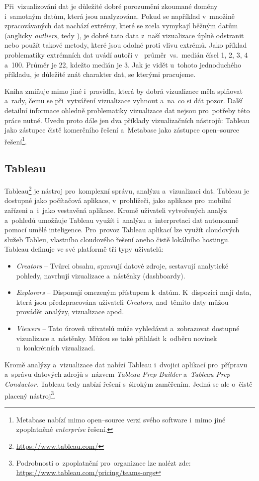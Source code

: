 Při~vizualizování dat je důležité dobré porozumění zkoumané domény i~samotným datům, která jsou analyzována. Pokud se například v~množině zpracovávaných dat nachází extrémy, které se zcela vymykají běžným datům (anglicky
\textit{outliers}, tedy ), je dobré tato data z~naší vizualizace úplně odstranit nebo
použít takové metody, které jsou odolné proti vlivu extrémů. Jako příklad problematiky extrémních dat uvádí autoři
v~\cite{HandsOnDataVisualization} průměr~vs.~medián čísel 1, 2, 3, 4 a~100. Průměr je 22, kdežto medián je 3. Jak je
vidět u~tohoto jednoduchého příkladu, je důležité znát charakter dat, se kterými pracujeme.

Kniha zmiňuje mimo jiné i~pravidla, která by dobrá vizualizace měla splňovat a~rady, čemu se při~vytváření
vizualizace vyhnout a~na~co si dát pozor. Další detailní informace ohledně problematiky vizualizace dat nejsou
pro~potřeby této práce nutné. Uvedu proto dále jen dva příklady vizualizačních nástrojů: Tableau jako zástupce čistě komerčního řešení a~Metabase jako zástupce open--source řešení\footnote{Metabase nabízí mimo open--source verzi svého software i~mimo jiné zpoplatněné \textit{enterprise} řešení.}.

\subsection{Tableau}
\label{subsection:Tableu}
Tableau\footnote{\href{https://www.tableau.com/}{https://www.tableau.com/}} je nástroj pro~komplexní správu, analýzu
a~vizualizaci dat. Tableau je dostupné jako počítačová aplikace, v~prohlížeči, jako aplikace pro~mobilní zařízeni
a~i~jako vestavěná aplikace. Kromě uživateli vytvořených analýz a~pohledů umožňuje Tableau využít i~analýzu
a~interpretaci dat autonomně pomocí umělé inteligence. Pro~provoz Tableau aplikací lze využít cloudových služeb
Tableu, vlastního cloudového řešení anebo čistě lokálního hostingu.
Tableau definuje ve své platformě tři typy uživatelů:
\begin{itemize}
    \item \textit{Creators} -- Tvůrci obsahu, spravují datové zdroje, sestavují analytické pohledy, navrhují
    vizualizace a~nástěnky (dashboardy).
    \item \textit{Explorers} -- Disponují omezeným přístupem k~datům. K~dispozici mají data, která jsou
    předzpracována uživateli \textit{Creators}, nad~těmito daty můžou provádět analýzy, vizualizace apod.
    \item \textit{Viewers} -- Tato úroveň uživatelů může vyhledávat a~zobrazovat dostupné vizualizace a~nástěnky.
    Můžou se také přihlásit k~odběru novinek u~konkrétních vizualizací.
\end{itemize}
Kromě analýzy a~vizualizace dat nabízí Tableau i~dvojici aplikací pro~přípravu a~správu datových zdrojů s~názvem
\textit{Tableau Prep Builder} a~\textit{Tableau Prep Conductor}. Tableau tedy nabízí řešení s~širokým zaměřením. Jedná se ale o~čistě placený nástroj\footnote{Podrobnosti o~zpoplatnění pro~organizace lze nalézt zde: \href{https://www.tableau.com/pricing/teams-orgs}{https://www.tableau.com/pricing/teams-orgs}}.

